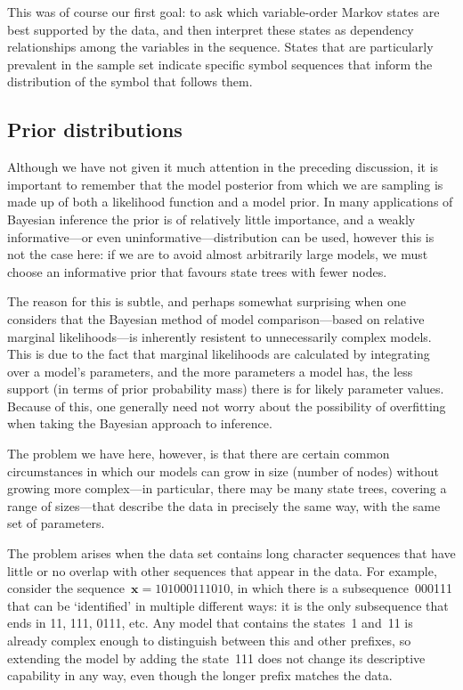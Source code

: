 \documentclass[12pt,a4paper]{article}
\newcommand\ub[1]{\symbf{#1}}                 %
\begin{document}
This was of course our first goal: to ask which variable-order Markov states are
best supported by the data, and then interpret these states as dependency
relationships among the variables in the sequence. States that are particularly
prevalent in the sample set indicate specific symbol sequences that inform the
distribution of the symbol that follows them.

\subsection{Prior distributions} %

Although we have not given it much attention in the preceding discussion, it is
important to remember that the model posterior from which we are sampling is
made up of both a likelihood function and a model prior. In many applications of
Bayesian inference the prior is of relatively little importance, and a weakly
informative---or even uninformative---distribution can be used, however this is
not the case here: if we are to avoid almost arbitrarily large models, we must
choose an informative prior that favours state trees with fewer nodes.

The reason for this is subtle, and perhaps somewhat surprising when one
considers that the Bayesian method of model comparison---based on relative
marginal likelihoods---is inherently resistent to unnecessarily complex models.
This is due to the fact that marginal likelihoods are calculated by integrating
over a model's parameters, and the more parameters a model has, the less support
(in terms of prior probability mass) there is for likely parameter values.
Because of this, one generally need not worry about the possibility of
overfitting when taking the Bayesian approach to inference.

The problem we have here, however, is that there are certain common
circumstances in which our models can grow in size (number of nodes) without
growing more complex---in particular, there may be many state trees, covering a
range of sizes---that describe the data in precisely the same way, with the same
set of parameters.

The problem arises when the data set contains long character sequences that have
little or no overlap with other sequences that appear in the data. For example,
consider the sequence~\(\ub{x} = 101000111010\), in which there is a
subsequence~000111 that can be `identified' in multiple different ways: it is
the only subsequence that ends in 11, 111, 0111, etc. Any model that contains
the states~1 and~11 is already complex enough to distinguish between this and
other prefixes, so extending the model by adding the state~111 does not change
its descriptive capability in any way, even though the longer prefix matches the
data.
\end{document}
